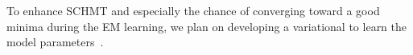 \documentclass{article}
\begin{document}
  To enhance SCHMT and especially the chance of converging toward a good minima during the EM learning, we plan on developing a variational to learn the model parameters~\cite{wainwright2008graphical}.

  
\vfill
\pagebreak

% 




% 
\end{document}
